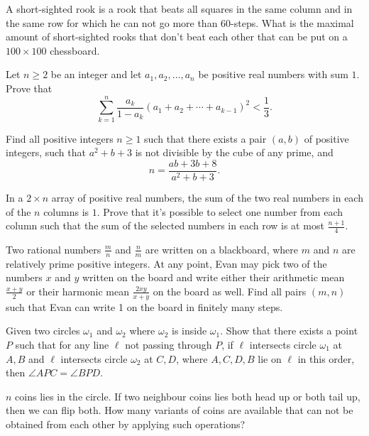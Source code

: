 \documentclass[11pt]{scrartcl}
\begin{document}
\begin{problem}[105422576188851]
A short-sighted rook is a rook that beats all squares in the same column and in the same row for which he can not go more than $60$-steps.
What is the maximal amount of short-sighted rooks that don't beat each other that can be put on a $100\times 100$ chessboard.
\end{problem}
\begin{problem}[723258861624579]
Let $n\geq 2$ be an integer and let $a_1, a_2, \ldots, a_n$ be positive real numbers with sum $1$. Prove that$$\sum_{k=1}^n \frac{a_k}{1-a_k}(a_1+a_2+\cdots+a_{k-1})^2 < \frac{1}{3}.$$
\end{problem}
\begin{problem}[4375421764909014892]
	Find all positive integers $n\geq1$ such that there exists a pair $(a,b)$ of positive integers, such that $a^2+b+3$ is not divisible by the cube of any prime, and$$n=\frac{ab+3b+8}{a^2+b+3}.$$
\end{problem}
\begin{problem}[245448917471703]
  In a $2 \times n$ array of positive real numbers,
  the sum of the two real numbers in each of the $n$ columns is $1$.
  Prove that it's possible to select one number from each column
  such that the sum of the selected numbers in each row is
  at most $\frac{n+1}{4}$.
\end{problem}
\begin{problem}[545015136325290]
	Two rational numbers \(\tfrac{m}{n}\) and \(\tfrac{n}{m}\) are written on a blackboard, where \(m\) and \(n\) are relatively prime positive integers. At any point, Evan may pick two of the numbers \(x\) and \(y\) written on the board and write either their arithmetic mean \(\tfrac{x+y}{2}\) or their harmonic mean \(\tfrac{2xy}{x+y}\) on the board as well. Find all pairs \((m,n)\) such that Evan can write 1 on the board in finitely many steps.
\end{problem}
\begin{problem}[7268978143074030034]
Given two circles $\omega_1$ and $\omega_2$ where $\omega_2$ is inside $\omega_1$. Show that there exists a point $P$ such that for any line $\ell$ not passing through $P$, if $\ell$ intersects circle $\omega_1$ at $A,B$ and $\ell$ intersects circle $\omega_2$ at $C,D$, where $A,C,D,B$ lie on $\ell$ in this order, then $\angle APC=\angle BPD$.
\end{problem}
\begin{problem}[937132258882447]
	$n$ coins lies in the circle. If two neighbour coins lies both head up or both tail up, then we can flip both. How many variants of coins are available that can not be obtained from each other by applying such operations?
\end{problem}
\end{document}
